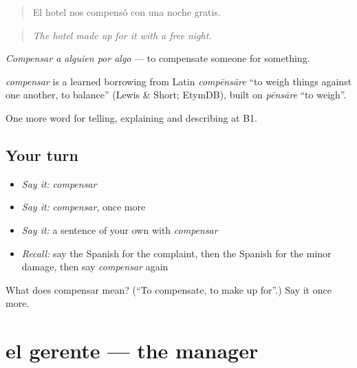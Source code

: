 \begin{quote}
El hotel nos compensó con una noche gratis.
\end{quote}

\begin{quote}
\emph{The hotel made up for it with a free night.}
\end{quote}

\emph{Compensar a alguien por algo} — to compensate someone for something.

\begin{cousinweb}
\emph{compensar} is a learned borrowing from Latin \emph{compēnsāre} \textquotedblleft{}to weigh things against one another, to balance\textquotedblright{} (Lewis \& Short; EtymDB), built on \emph{pēnsāre} \textquotedblleft{}to weigh\textquotedblright{}.
\end{cousinweb}

\begin{grammarlens}[title={What you've built}]
One more word for telling, explaining and describing at B1.
\end{grammarlens}

\subsection*{Your turn}
\begin{itemize}
\raggedright
  \item \emph{Say it:} \emph{compensar}
  \item \emph{Say it:} \emph{compensar}, once more
  \item \emph{Say it:} a sentence of your own with \emph{compensar}
  \item \emph{Recall:} say the Spanish for the complaint, then the Spanish for the minor damage, then say \emph{compensar} again
\end{itemize}

\begin{tcolorbox}[breakable,colback=teal!4,colframe=teal!35!black,title={Before you move on}]
What does compensar mean? (\textquotedblleft{}To compensate, to make up for\textquotedblright{}.) Say it once more.
\end{tcolorbox}
\section[el gerente]{el gerente — the manager}

\label{lesson:ES-C665-gerente}



